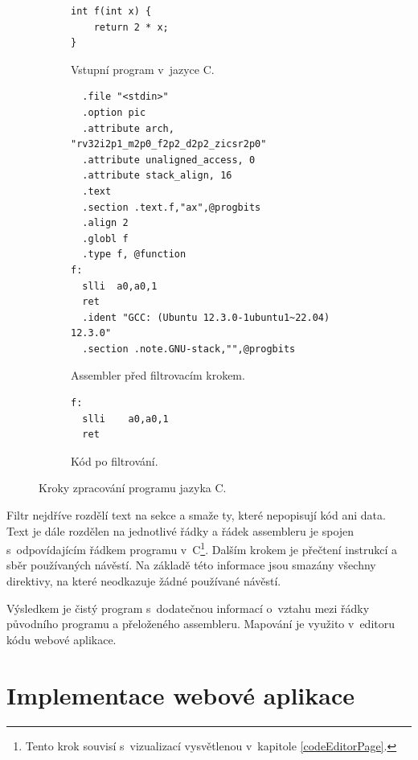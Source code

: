 \begin{figure}[ht]
     \centering
     \begin{subfigure}[b]{0.4\textwidth}
         \centering
         \begin{lstlisting}
int f(int x) {
    return 2 * x;
}
\end{lstlisting}
         \caption{Vstupní program v~jazyce C.}
         \label{asmFilterA}
     \end{subfigure}
     \hfill
     \begin{subfigure}[b]{0.6\textwidth}
         \centering
         \begin{lstlisting}
  .file "<stdin>"
  .option pic
  .attribute arch, "rv32i2p1_m2p0_f2p2_d2p2_zicsr2p0"
  .attribute unaligned_access, 0
  .attribute stack_align, 16
  .text
  .section .text.f,"ax",@progbits
  .align 2
  .globl f
  .type f, @function
f:
  slli  a0,a0,1
  ret
  .ident "GCC: (Ubuntu 12.3.0-1ubuntu1~22.04) 12.3.0"
  .section .note.GNU-stack,"",@progbits

\end{lstlisting}
         \caption{Assembler před filtrovacím krokem.}
         \label{asmFilterB}
     \end{subfigure}
          \hfill
     \begin{subfigure}[b]{0.4\textwidth}
         \centering
         \begin{lstlisting}
f:
  slli    a0,a0,1
  ret
\end{lstlisting}
         \caption{Kód po filtrování.}
         \label{asmFilterC}
     \end{subfigure}
        \caption{Kroky zpracování programu jazyka C.}
        \label{asmFilter}
\end{figure}

Filtr nejdříve rozdělí text na sekce a smaže ty, které nepopisují kód ani data.
Text je dále rozdělen na jednotlivé řádky a řádek assembleru je spojen s~odpovídajícím řádkem programu v~C\footnote{Tento krok souvisí s~vizualizací vysvětlenou v~kapitole \ref{codeEditorPage}.}. 
Dalším krokem je přečtení instrukcí a sběr používaných návěstí.
Na základě této informace jsou smazány všechny direktivy, na které neodkazuje žádné používané návěstí.

Výsledkem je čistý program s~dodatečnou informací o~vztahu mezi řádky původního programu a přeloženého assembleru.
Mapování je využito v~editoru kódu webové aplikace.

\chapter{Implementace webové aplikace}
\label{implementaceweboveaplikace}

